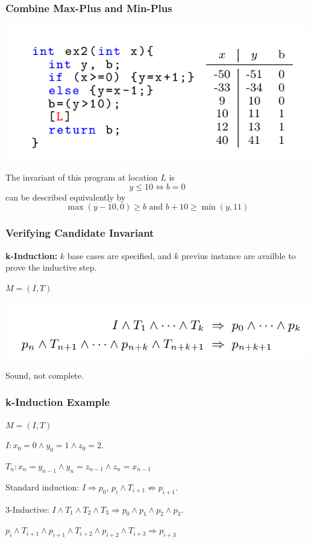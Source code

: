 \documentclass[11pt]{beamer}
\begin{document}
\begin{frame}\frametitle{Combine Max-Plus and Min-Plus}
\begin{center}
\includegraphics[scale=0.35]{11.png}
\end{center}
The invariant of this program at location $L$ is 
\[y\le 10 \Leftrightarrow b = 0\]
can be described equivalently by 
\[\max(y - 10, 0) \ge b \text{ and } b + 10 \ge\min(y, 11)\]
\end{frame}

\begin{frame}\frametitle{Verifying Candidate Invariant}
\textbf{k-Induction:} $k$ base cases are specified, and $k$ previus instance are availble to prove the inductive step.

$M = (I,T)$
\begin{center}
\includegraphics[scale=0.35]{7.png}
\end{center}
Sound, not complete.



\end{frame}

\begin{frame}\frametitle{k-Induction Example}
\begin{example}[2]
$M = (I,T)$

$I: x_0 = 0\wedge y_0 = 1\wedge z_0 = 2$.

$T_n: x_n = y_{n-1} \wedge y_n = z_{n-1} \wedge z_n = x_{n - 1}$
\end{example}

Standard induction: $I\Rightarrow p_0$, $p_i \wedge T_{i+1} \not\Rightarrow p_{i+1}$.

3-Inductive: $I \wedge T_1 \wedge T_2\wedge T_3 \Rightarrow p_0 \wedge p_1\wedge p_2\wedge p_3$.

$p_i\wedge T_{i+1} \wedge p_{i+1}\wedge T_{i+2} \wedge p_{i+2}\wedge T_{i+3} \Rightarrow p_{i+3}$
\end{frame}
\end{document}
